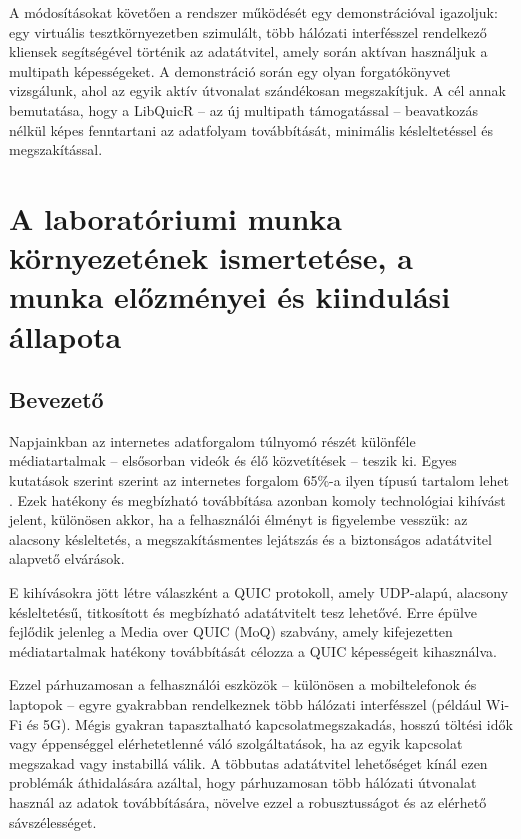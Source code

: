 \documentclass[a4paper,oneside]{article}
\begin{document}
\begin{titlepage}
{  A módosításokat követően a rendszer működését egy demonstrációval 
  igazoljuk: egy virtuális tesztkörnyezetben szimulált, több hálózati 
  interfésszel rendelkező kliensek segítségével történik az adatátvitel, 
  amely során aktívan használjuk a multipath képességeket. A demonstráció 
  során egy olyan forgatókönyvet vizsgálunk, ahol az egyik aktív 
  útvonalat szándékosan megszakítjuk. 
  A cél annak bemutatása, hogy a LibQuicR – az új multipath támogatással – 
  beavatkozás nélkül képes fenntartani az adatfolyam 
  továbbítását, minimális késleltetéssel és megszakítással.}

 
  
 
\end{titlepage} 

\section{A laboratóriumi munka környezetének ismertetése,
     a munka előzményei és kiindulási állapota}
\label{sec:kornyezet}
\subsection{Bevezető}
\label{sec:bevezeto}
Napjainkban az internetes adatforgalom túlnyomó részét különféle médiatartalmak – 
elsősorban videók és élő közvetítések – teszik ki. Egyes kutatások szerint 
szerint az internetes forgalom 65\%-a ilyen típusú tartalom lehet \cite{live_stats}. 
Ezek hatékony és megbízható továbbítása azonban komoly 
technológiai kihívást jelent, különösen akkor, ha a felhasználói élményt is 
figyelembe vesszük: az alacsony késleltetés, a megszakításmentes lejátszás 
és a biztonságos adatátvitel alapvető elvárások.

E kihívásokra jött létre válaszként a QUIC protokoll, amely UDP-alapú, alacsony 
késleltetésű, titkosított és megbízható adatátvitelt tesz lehetővé. Erre épülve 
fejlődik jelenleg a Media over QUIC (MoQ) szabvány, amely kifejezetten 
médiatartalmak hatékony továbbítását célozza a QUIC képességeit kihasználva.

Ezzel párhuzamosan a felhasználói eszközök – különösen a mobiltelefonok és 
laptopok – egyre gyakrabban rendelkeznek több hálózati interfésszel (például Wi-Fi és 5G). 
Mégis gyakran tapasztalható kapcsolatmegszakadás, hosszú töltési idők vagy éppenséggel 
elérhetetlenné váló szolgáltatások, ha az egyik kapcsolat megszakad vagy instabillá 
válik. A többutas adatátvitel lehetőséget kínál ezen problémák áthidalására azáltal, 
hogy párhuzamosan több hálózati útvonalat használ az adatok továbbítására, növelve 
ezzel a robusztusságot és az elérhető sávszélességet.
\end{document}
